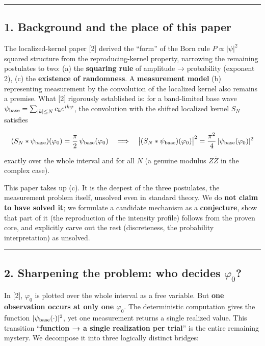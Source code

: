 \documentclass[
]{ltjsarticle}
\begin{document}
\begin{center}\rule{0.5\linewidth}{0.5pt}\end{center}

\subsection{1. Background and the place of this
paper}\label{background-and-the-place-of-this-paper}

The localized-kernel paper {[}2{]} derived the ``form'' of the Born rule
\(P\propto|\psi|^2\) squared structure from the reproducing-kernel
property, narrowing the remaining postulates to two: (a) the
\textbf{squaring rule} of amplitude → probability (exponent 2), (c) the
\textbf{existence of randomness}. A \textbf{measurement model} (b)
representing measurement by the convolution of the localized kernel also
remains a premise. What {[}2{]} rigorously established is: for a
band-limited base wave
\(\psi_{\rm base}=\sum_{|k|\le N}c_k e^{ik\varphi}\), the convolution
with the shifted localized kernel \(S_N\) satisfies

\[
(S_N*\psi_{\rm base})(\varphi_0)=\frac{\pi}{2}\,\psi_{\rm base}(\varphi_0)
\quad\Longrightarrow\quad
\big|(S_N*\psi_{\rm base})(\varphi_0)\big|^2=\frac{\pi^2}{4}\,|\psi_{\rm base}(\varphi_0)|^2
\]

exactly over the whole interval and for all \(N\) (a genuine modulus
\(Z\bar Z\) in the complex case).

This paper takes up (c). It is the deepest of the three postulates, the
measurement problem itself, unsolved even in standard theory. We do
\textbf{not claim to have solved it}; we formulate a candidate mechanism
as a \textbf{conjecture}, show that part of it (the reproduction of the
intensity profile) follows from the proven core, and explicitly carve
out the rest (discreteness, the probability interpretation) as unsolved.

\begin{center}\rule{0.5\linewidth}{0.5pt}\end{center}

\subsection{\texorpdfstring{2. Sharpening the problem: who decides
\(\varphi_0\)?}{2. Sharpening the problem: who decides \textbackslash varphi\_0?}}\label{sharpening-the-problem-who-decides-varphi_0}

In {[}2{]}, \(\varphi_0\) is plotted over the whole interval as a free
variable. But \textbf{one observation occurs at only one \(\varphi_0\)}.
The deterministic computation gives the function
\(|\psi_{\rm base}(\cdot)|^2\), yet one measurement returns a single
realized value. This transition ``\textbf{function → a single
realization per trial}'' is the entire remaining mystery. We decompose
it into three logically distinct bridges:
\end{document}
